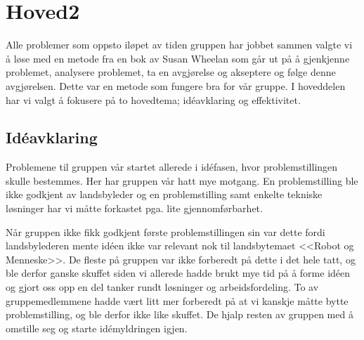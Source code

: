 
\chapter{Hoved2} %

\label{ch:hoved2} %





Alle problemer som oppsto iløpet av tiden gruppen har jobbet sammen valgte vi å løse med en metode fra en bok av  Susan Wheelan \cite[s.
61-63]{wheelan_creating_2012} som går ut på å gjenkjenne problemet, analysere problemet, ta en avgjørelse og akseptere og følge denne avgjørelsen. Dette var en metode som fungere bra for vår gruppe. I hoveddelen har vi valgt å fokusere på to hovedtema; idéavklaring og effektivitet.

\section{Idéavklaring}
Problemene til gruppen vår startet allerede i idéfasen, hvor problemstillingen skulle bestemmes. Her har gruppen vår hatt mye motgang. En problemstilling ble ikke godkjent av landsbyleder og en problemstilling samt enkelte tekniske løsninger har vi måtte forkastet pga. lite gjennomførbarhet.

Når gruppen ikke fikk godkjent første problemstillingen sin var dette fordi landsbylederen mente idéen ikke var relevant nok til landsbytemaet <<Robot og Menneske>>. De fleste på gruppen var ikke forberedt på dette i det hele tatt, og ble derfor ganske skuffet siden vi allerede hadde brukt mye tid på å forme idéen og gjort oss opp en del tanker rundt løsninger og arbeidsfordeling. To av gruppemedlemmene hadde vært litt mer forberedt på at vi kanskje måtte bytte problemstilling, og ble derfor ikke like skuffet. De hjalp resten av gruppen med å omstille seg og starte idémyldringen igjen.  

